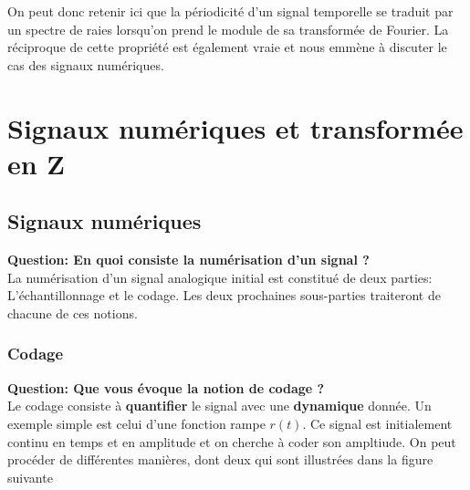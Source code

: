 \documentclass[11pt,a4paper]{article}
\begin{document}
On peut donc retenir ici que la périodicité d'un signal temporelle se traduit par un spectre de raies lorsqu'on prend le module de sa transformée de Fourier. La réciproque de cette propriété est également vraie et nous emmène à discuter le cas des signaux numériques.\\

\section{Signaux numériques et transformée en Z}

\subsection{Signaux numériques}

\textbf{Question: En quoi consiste la numérisation d'un signal ?} \\

La numérisation d'un signal analogique initial est constitué de deux parties: L'échantillonnage et le codage. Les deux prochaines sous-parties traiteront de chacune de ces notions.

\subsubsection{Codage}

\textbf{Question: Que vous évoque la notion de codage ?} \\

Le codage consiste à \textbf{quantifier} le signal avec une \textbf{dynamique} donnée. Un exemple simple est celui d'une fonction rampe $r(t)$. Ce signal est initialement continu en temps et en amplitude et on cherche à coder son ampltiude. On peut procéder de différentes manières, dont deux qui sont illustrées dans la figure suivante \\
\end{document}
